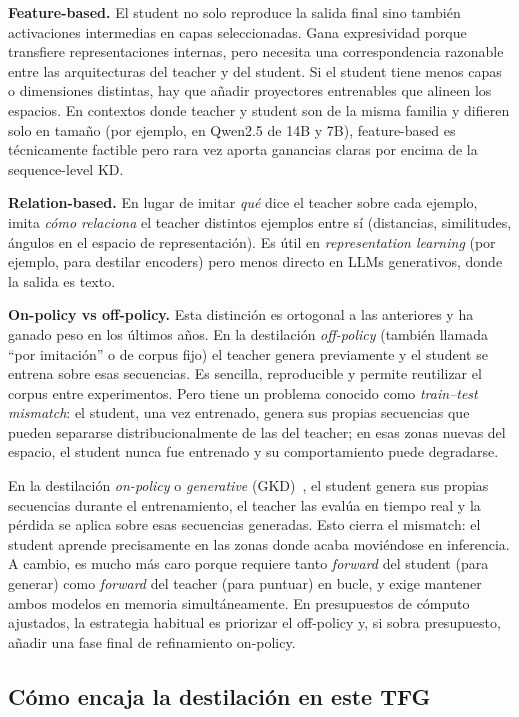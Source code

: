 \documentclass[11pt,a4paper]{article}
\begin{document}
\textbf{Feature-based.} El student no solo reproduce la salida final sino también activaciones intermedias en capas seleccionadas. Gana expresividad porque transfiere representaciones internas, pero necesita una correspondencia razonable entre las arquitecturas del teacher y del student. Si el student tiene menos capas o dimensiones distintas, hay que añadir proyectores entrenables que alineen los espacios. En contextos donde teacher y student son de la misma familia y difieren solo en tamaño (por ejemplo, en Qwen2.5 de 14B y 7B), feature-based es técnicamente factible pero rara vez aporta ganancias claras por encima de la sequence-level KD.

\textbf{Relation-based.} En lugar de imitar \emph{qué} dice el teacher sobre cada ejemplo, imita \emph{cómo relaciona} el teacher distintos ejemplos entre sí (distancias, similitudes, ángulos en el espacio de representación). Es útil en \textit{representation learning} (por ejemplo, para destilar encoders) pero menos directo en LLMs generativos, donde la salida es texto.

\textbf{On-policy vs off-policy.} Esta distinción es ortogonal a las anteriores y ha ganado peso en los últimos años. En la destilación \textit{off-policy} (también llamada ``por imitación'' o de corpus fijo) el teacher genera previamente y el student se entrena sobre esas secuencias. Es sencilla, reproducible y permite reutilizar el corpus entre experimentos. Pero tiene un problema conocido como \textit{train--test mismatch}: el student, una vez entrenado, genera sus propias secuencias que pueden separarse distribucionalmente de las del teacher; en esas zonas nuevas del espacio, el student nunca fue entrenado y su comportamiento puede degradarse.

En la destilación \textit{on-policy} o \textit{generative} (GKD)~\cite{agarwal2024gkd}, el student genera sus propias secuencias durante el entrenamiento, el teacher las evalúa en tiempo real y la pérdida se aplica sobre esas secuencias generadas. Esto cierra el mismatch: el student aprende precisamente en las zonas donde acaba moviéndose en inferencia. A cambio, es mucho más caro porque requiere tanto \textit{forward} del student (para generar) como \textit{forward} del teacher (para puntuar) en bucle, y exige mantener ambos modelos en memoria simultáneamente. En presupuestos de cómputo ajustados, la estrategia habitual es priorizar el off-policy y, si sobra presupuesto, añadir una fase final de refinamiento on-policy.

\subsection{Cómo encaja la destilación en este TFG}
\end{document}
